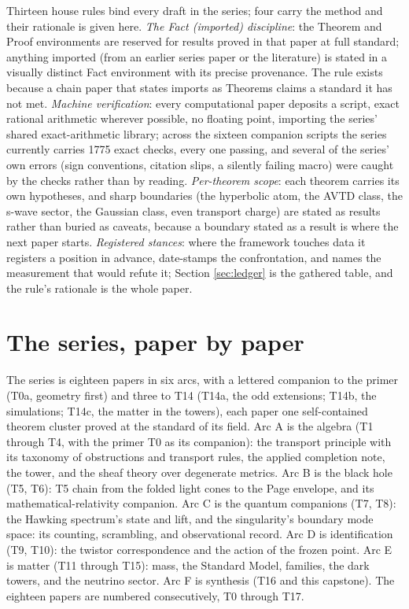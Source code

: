 \documentclass[11pt]{article}
\theoremstyle{definition}
\begin{document}
Thirteen house rules bind every draft in the series; four carry the method and their rationale is given here. \emph{The Fact (imported) discipline}: the Theorem and Proof environments are reserved for results proved in that paper at full standard; anything imported (from an earlier series paper or the literature) is stated in a visually distinct Fact environment with its precise provenance. The rule exists because a chain paper that states imports as Theorems claims a standard it has not met. \emph{Machine verification}: every computational paper deposits a script, exact rational arithmetic wherever possible, no floating point, importing the series' shared exact-arithmetic library; across the sixteen companion scripts the series currently carries 1775 exact checks, every one passing, and several of the series' own errors (sign conventions, citation slips, a silently failing macro) were caught by the checks rather than by reading. \emph{Per-theorem scope}: each theorem carries its own hypotheses, and sharp boundaries (the hyperbolic atom, the AVTD class, the s-wave sector, the Gaussian class, even transport charge) are stated as results rather than buried as caveats, because a boundary stated as a result is where the next paper starts. \emph{Registered stances}: where the framework touches data it registers a position in advance, date-stamps the confrontation, and names the measurement that would refute it; Section \ref{sec:ledger} is the gathered table, and the rule's rationale is the whole paper.

\section{The series, paper by paper}\label{sec:status}

The series is eighteen papers in six arcs, with a lettered companion to the primer (T0a, geometry first) and three to T14 (T14a, the odd extensions; T14b, the simulations; T14c, the matter in the towers), each paper one self-contained theorem cluster proved at the standard of its field. Arc A is the algebra (T1 through T4, with the primer T0 as its companion): the transport principle with its taxonomy of obstructions and transport rules, the applied completion note, the tower, and the sheaf theory over degenerate metrics. Arc B is the black hole (T5, T6): T5 chain from the folded light cones to the Page envelope, and its mathematical-relativity companion. Arc C is the quantum companions (T7, T8): the Hawking spectrum's state and lift, and the singularity's boundary mode space: its counting, scrambling, and observational record. Arc D is identification (T9, T10): the twistor correspondence and the action of the frozen point. Arc E is matter (T11 through T15): mass, the Standard Model, families, the dark towers, and the neutrino sector. Arc F is synthesis (T16 and this capstone). The eighteen papers are numbered consecutively, T0 through T17.
\end{document}
